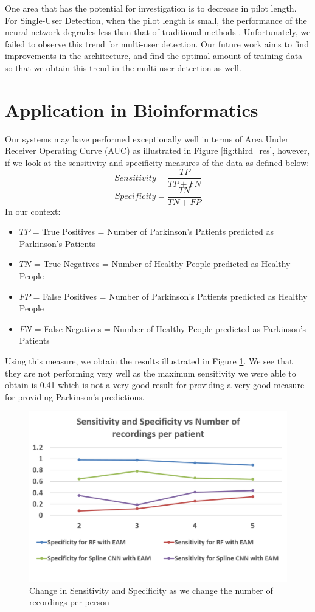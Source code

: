 One area that has the potential for investigation is to decrease in pilot length. For Single-User Detection, when the pilot length is small, the performance of the neural network degrades less than that of traditional methods \cite{ye2018power}. Unfortunately, we failed to observe this trend for multi-user detection. Our future work aims to find improvements in the architecture, and find the optimal amount of training data so that we obtain this trend in the multi-user detection as well. 

\section{Application in Bioinformatics}
Our systems may have performed exceptionally well in terms of Area Under Receiver Operating Curve (AUC) as illustrated in Figure \ref{fig:third_res}, however, if we look at the sensitivity and specificity measures of the data as defined below:
$$Sensitivity = \frac{TP}{TP + FN}$$
$$Specificity = \frac{TN}{TN + FP}$$
In our context:
\begin{itemize}
\item $TP$ = True Positives = Number of Parkinson's Patients predicted as Parkinson's Patients
\item $TN$ = True Negatives = Number of Healthy People predicted as Healthy People
\item $FP$ = False Positives = Number of Parkinson's Patients predicted as Healthy People
\item $FN$ = False Negatives = Number of Healthy People predicted as Parkinson's Patients
\end{itemize}
Using this measure, we obtain the results illustrated in Figure \ref{fig:sens}. We see that they are not performing very well as the maximum sensitivity we were able to obtain is 0.41 which is not a very good result for providing a very good measure for providing Parkinson's predictions.
\begin{figure}[htbp]
  \centering
  \includegraphics[width=\textwidth]{./Figures/park_sens_spec.png}
  \caption{Change in Sensitivity and Specificity as we change the number of recordings per person}
  \label{fig:sens}
\end{figure}
